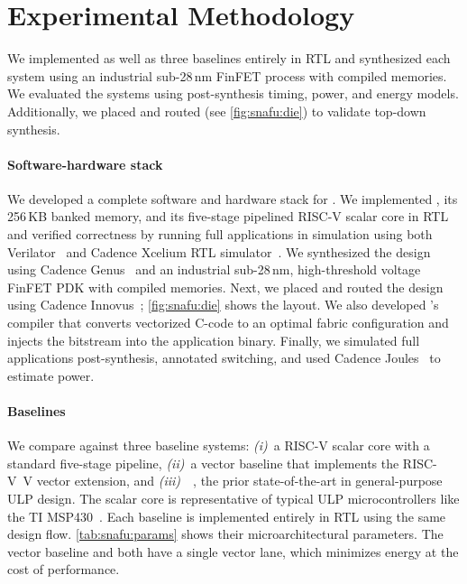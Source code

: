 \section{Experimental Methodology}
\label{snafu:method}

\figSNAFUDie

We implemented \snafuarch as well as three baselines entirely in RTL and synthesized each system using
an industrial sub-28\,nm FinFET process with compiled memories.
% 
We evaluated the systems using post-synthesis timing, power, and energy models.
% 
Additionally, we placed and routed \snafuarch (see \autoref{fig:snafu:die}) to validate top-down synthesis.

\paragraph{Software-hardware stack}
We developed a complete software and hardware stack for \snafu.
% 
We implemented \snafuarch, its 256\,KB banked memory, and its five-stage pipelined \mbox{RISC-V} scalar core in RTL and verified correctness by running full applications in simulation using both Verilator~\cite{snyder2004verilator} and Cadence Xcelium RTL simulator~\cite{xcelium}.
% 
We synthesized the design using Cadence Genus~\cite{genus} and an industrial sub-28\,nm, high-threshold voltage FinFET PDK with compiled memories.
% 
Next, we placed and routed the design using Cadence Innovus~\cite{innovus};
% 
\autoref{fig:snafu:die} shows the layout.
% 
We also developed \snafuframe's compiler that converts vectorized C-code to an optimal fabric configuration and injects the bitstream into the application binary.
% 
Finally, we simulated full applications post-synthesis, annotated switching, and
used Cadence Joules~\cite{joules} to estimate power.

\tabSNAFUTabs

\paragraph{Baselines}
We compare \snafuarch against three baseline systems:
\emph{(i)}~a RISC-V scalar core with a standard five-stage pipeline,
\emph{(ii)}~a vector baseline that implements the \mbox{RISC-V V} vector extension,
and \emph{(iii)}~\manic~\cite{manic}, the prior state-of-the-art in general-purpose ULP design.
%
The scalar core is representative of typical ULP microcontrollers like the TI MSP430~\cite{msp430fr5994}.
% 
Each baseline is implemented entirely in RTL using the same design flow. 
%
\autoref{tab:snafu:params} shows their microarchitectural parameters.
%
The vector baseline and \manic both have a single vector lane, which minimizes energy at the cost of performance.

